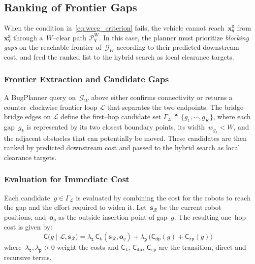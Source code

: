 \subsection{Ranking of Frontier Gaps}\label{subsec:gap}

When the condition in~\eqref{eq:wccg_criterion} fails, the vehicle cannot
reach~$\mathbf{x}_\texttt{V}^{\texttt{G}}$ from
$\mathbf{x}_\texttt{V}^{\texttt{S}}$ through a~$W$--clear path
$\mathcal{P}^W_\texttt{V}$.
In this case, the planner must prioritize
\emph{blocking gaps} on the reachable frontier of~$\mathcal{G}_W$
according to their predicted downstream cost, and feed the ranked list to the
hybrid search as local clearance targets.

\subsubsection{Frontier Extraction and Candidate Gaps}
A BugPlanner query on~$\mathcal{G}_W$ above
either confirms connectivity or returns a counter--clockwise frontier loop
$\mathcal{L}$ that separates the two endpoints. The bridge--bridge edges on
$\mathcal{L}$ define the first--hop candidate set
$\Gamma_\mathcal{L}\triangleq\{g_1,\cdots,g_K\}$,
where each gap~$g_k$ is represented by its two closest boundary points, its
width~$w_{g_k}<W$, and the adjacent obstacles that can potentially be moved.
These candidates are then ranked by predicted downstream cost and passed to the
hybrid search as local clearance targets.

\subsubsection{Evaluation for Immediate Cost}
Each candidate~$g\in\Gamma_\mathcal{L}$ is evaluated by combining the
cost for the robots to reach the gap and the effort required to widen it.
Let~$\mathbf{s}_{\mathcal{R}}$ be the current robot positions,
and~$\mathbf{o}_g$ as the outside insertion point of gap~$g$. The
resulting one--hop cost is given by:
\begin{equation}\label{eq:step_cost}
\mathsf{C}\big(g \mid \mathcal{L}, \mathbf{s}_{\mathcal{R}}\big)
=\lambda_\texttt{t}\,\mathsf{C}_\texttt{t}\!\left(\mathbf{s}_{\mathcal{R}},\mathbf{o}_g\right)
+\lambda_\texttt{p}\,\big( \mathsf{C}_\texttt{dp}(g) + \mathsf{C}_\texttt{rp}(g)\big)
\end{equation}
where~$\lambda_\texttt{t},\lambda_\texttt{p}>0$ weight the costs and $\mathsf{C}_\texttt{t}$, $\mathsf{C}_\texttt{dp}$, $\mathsf{C}_\texttt{rp}$ are the transition, direct and recursive terms.

